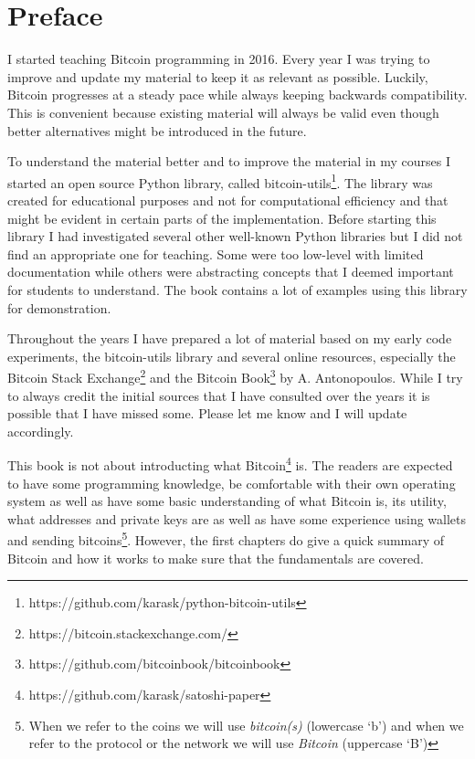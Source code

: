 
\section{Preface}
I started teaching Bitcoin programming in 2016. Every year I was trying to improve and update my material to keep it as relevant as possible. Luckily, Bitcoin progresses at a steady pace while always keeping backwards compatibility. This is convenient because existing material will always be valid even though better alternatives might be introduced in the future.

To understand the material better and to improve the material in my courses I started an open source Python library, called bitcoin-utils\footnote{https://github.com/karask/python-bitcoin-utils}. The library was created for educational purposes and not for computational efficiency and that might be evident in certain parts of the implementation. Before starting this library I had investigated several other well-known Python libraries but I did not find an appropriate one for teaching. Some were too low-level with limited documentation while others were abstracting concepts that I deemed important for students to understand. The book contains a lot of examples using this library for demonstration.

Throughout the years I have prepared a lot of material based on my early code experiments, the bitcoin-utils library and several online resources, especially the Bitcoin Stack Exchange\footnote{https://bitcoin.stackexchange.com/} and the Bitcoin Book\footnote{https://github.com/bitcoinbook/bitcoinbook} by A. Antonopoulos. While I try to always credit the initial sources that I have consulted over the years it is possible that I have missed some. Please let me know and I will update accordingly.

This book is not about introducting what Bitcoin\footnote{https://github.com/karask/satoshi-paper} is. The readers are expected to have some programming knowledge, be comfortable with their own operating system as well as have some basic understanding of what Bitcoin is, its utility, what addresses and private keys are as well as have some experience using wallets and sending bitcoins\footnote{When we refer to the coins we will use \emph{bitcoin(s)} (lowercase `b') and when we refer to the protocol or the network we will use \emph{Bitcoin} (uppercase `B')}. However, the first chapters do give a quick summary of Bitcoin and how it works to make sure that the fundamentals are covered.

